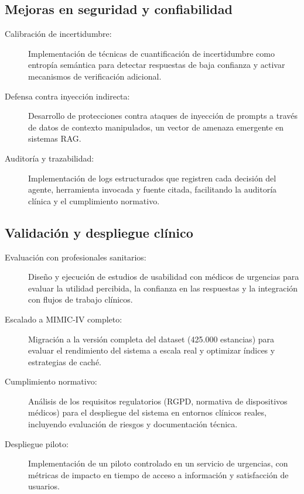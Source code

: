 \subsection{Mejoras en seguridad y confiabilidad}

\begin{description}
    \item[Calibración de incertidumbre:] Implementación de técnicas de cuantificación de incertidumbre como entropía semántica \parencite{farquhar2024semantic} para detectar respuestas de baja confianza y activar mecanismos de verificación adicional.
    
    \item[Defensa contra inyección indirecta:] Desarrollo de protecciones contra ataques de inyección de prompts a través de datos de contexto manipulados, un vector de amenaza emergente en sistemas \ac{RAG}.
    
    \item[Auditoría y trazabilidad:] Implementación de logs estructurados que registren cada decisión del agente, herramienta invocada y fuente citada, facilitando la auditoría clínica y el cumplimiento normativo.
\end{description}

\subsection{Validación y despliegue clínico}

\begin{description}
    \item[Evaluación con profesionales sanitarios:] Diseño y ejecución de estudios de usabilidad con médicos de urgencias para evaluar la utilidad percibida, la confianza en las respuestas y la integración con flujos de trabajo clínicos.
    
    \item[Escalado a \ac{MIMIC}-IV completo:] Migración a la versión completa del dataset (425.000 estancias) para evaluar el rendimiento del sistema a escala real y optimizar índices y estrategias de caché.
    
    \item[Cumplimiento normativo:] Análisis de los requisitos regulatorios (\ac{RGPD}, normativa de dispositivos médicos) para el despliegue del sistema en entornos clínicos reales, incluyendo evaluación de riesgos y documentación técnica.
    
    \item[Despliegue piloto:] Implementación de un piloto controlado en un servicio de urgencias, con métricas de impacto en tiempo de acceso a información y satisfacción de usuarios.
\end{description}

